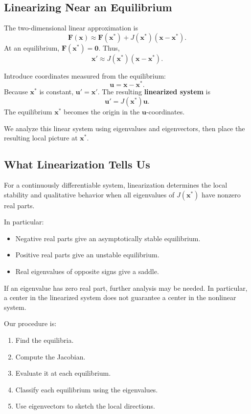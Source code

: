 \documentclass[10pt,letterpaper]{article}
\begin{document}
\subsection{Linearizing Near an Equilibrium}

The two-dimensional linear approximation is
\[
\mathbf{F}(\mathbf{x})
\approx
\mathbf{F}(\mathbf{x}^*)
+J(\mathbf{x}^*)(\mathbf{x}-\mathbf{x}^*).
\]
At an equilibrium, $\mathbf{F}(\mathbf{x}^*)=\mathbf{0}$.
Thus,
\[
\mathbf{x}'\approx
J(\mathbf{x}^*)(\mathbf{x}-\mathbf{x}^*).
\]

Introduce coordinates measured from the equilibrium:
\[
\mathbf{u}=\mathbf{x}-\mathbf{x}^*.
\]
Because $\mathbf{x}^*$ is constant,
$\mathbf{u}'=\mathbf{x}'$. The resulting
\textbf{linearized system} is
\[
\boxed{
\mathbf{u}'=J(\mathbf{x}^*)\mathbf{u}.
}
\]
The equilibrium $\mathbf{x}^*$ becomes the origin
in the $\mathbf{u}$-coordinates.

We analyze this linear system using eigenvalues
and eigenvectors, then place the resulting local
picture at $\mathbf{x}^*$.

\subsection{What Linearization Tells Us}

For a continuously differentiable system, linearization
determines the local stability and qualitative behavior
when all eigenvalues of $J(\mathbf{x}^*)$ have nonzero
real parts.

In particular:
\begin{itemize}
    \item Negative real parts give an asymptotically
    stable equilibrium.
    \item Positive real parts give an unstable equilibrium.
    \item Real eigenvalues of opposite signs give a saddle.
\end{itemize}

If an eigenvalue has zero real part, further analysis
may be needed. In particular, a center in the linearized
system does not guarantee a center in the nonlinear system.

Our procedure is:
\begin{enumerate}
    \item Find the equilibria.
    \item Compute the Jacobian.
    \item Evaluate it at each equilibrium.
    \item Classify each equilibrium using the eigenvalues.
    \item Use eigenvectors to sketch the local directions.
\end{enumerate}
\end{document}
